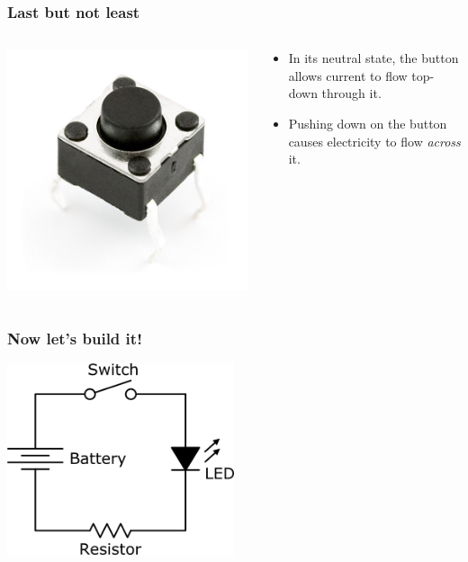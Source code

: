 \documentclass{beamer}
\begin{document}
\begin{frame}
  \frametitle{Last but not least}
  
  \begin{columns}
    \begin{column}{0.5\textwidth}
      \includegraphics[width=\textwidth]{res/push-button.jpg}
    \end{column}
    \begin{column}{0.5\textwidth}
      \begin{itemize}
        \item
          In its neutral state, the button allows current to flow top-down
          through it.

        \item
          Pushing down on the button causes electricity to flow \emph{across} it.
      \end{itemize}
    \end{column}
  \end{columns}
\end{frame}

\begin{frame}
  \frametitle{Now let's build it!}
  \centering
  \includegraphics[width=0.5\textwidth]{res/led-diagram.png}
\end{frame}
\end{document}
